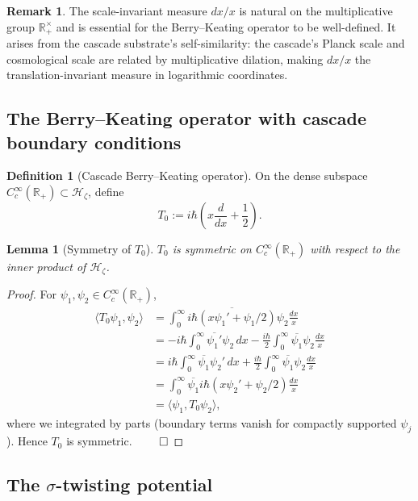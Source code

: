 \documentclass[11pt, a4paper]{amsart}
\newtheorem{lemma}[theorem]{Lemma}
\theoremstyle{definition}
\newtheorem{definition}[theorem]{Definition}
\newtheorem{remark}[theorem]{Remark}
\newcommand{\R}{\mathbb{R}}
\newcommand{\HH}{\mathcal{H}}
\begin{document}
\begin{remark}
The scale-invariant measure $dx/x$ is natural on the multiplicative group
$\R_+^\times$ and is essential for the Berry--Keating operator to be
well-defined. It arises from the cascade substrate's self-similarity:
the cascade's Planck scale and cosmological scale are related by
multiplicative dilation, making $dx/x$ the translation-invariant measure
in logarithmic coordinates.
\end{remark}

\subsection{The Berry--Keating operator with cascade boundary conditions}

\begin{definition}[Cascade Berry--Keating operator]\label{def:BK}
On the dense subspace $C_c^\infty(\R_+) \subset \HH_\zeta$, define
\[
T_0 := i\hbar \left(x \frac{d}{dx} + \frac{1}{2}\right).
\]
\end{definition}

\begin{lemma}[Symmetry of $T_0$]\label{lem:T0sym}
$T_0$ is symmetric on $C_c^\infty(\R_+)$ with respect to the inner
product of $\HH_\zeta$.
\end{lemma}

\begin{proof}
For $\psi_1, \psi_2 \in C_c^\infty(\R_+)$,
\begin{align*}
\langle T_0 \psi_1, \psi_2 \rangle
&= \int_0^\infty \overline{i\hbar(x \psi_1' + \psi_1/2)} \psi_2 \frac{dx}{x} \\
&= -i\hbar \int_0^\infty \overline{\psi_1'} \psi_2 \, dx - \frac{i\hbar}{2} \int_0^\infty \overline{\psi_1} \psi_2 \frac{dx}{x} \\
&= i\hbar \int_0^\infty \overline{\psi_1} \psi_2' \, dx + \frac{i\hbar}{2} \int_0^\infty \overline{\psi_1} \psi_2 \frac{dx}{x} \\
&= \int_0^\infty \overline{\psi_1} i\hbar(x \psi_2' + \psi_2/2) \frac{dx}{x} \\
&= \langle \psi_1, T_0 \psi_2 \rangle,
\end{align*}
where we integrated by parts (boundary terms vanish for compactly
supported $\psi_j$). Hence $T_0$ is symmetric. $\qed$
\end{proof}

\subsection{The $\sigma$-twisting potential}
\end{document}
